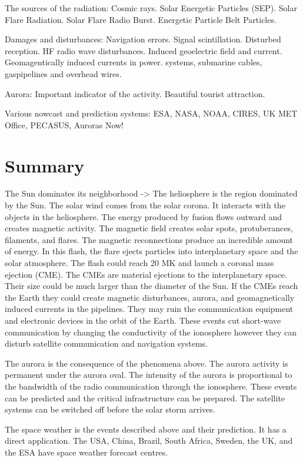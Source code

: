 \documentclass[sn-aps]{sn-jnl}%
\begin{document}
The sources of the radiation: Cosmic rays. Solar Energetic Particles (SEP). Solar Flare Radiation. Solar Flare Radio Burst. Energetic Particle Belt Particles.

Damages and disturbances: Navigation errors. Signal scintillation. Disturbed reception. HF radio wave disturbances. Induced geoelectric field and current. Geomagentically induced currents in power. systems, submarine cables, gaspipelines and overhead wires.

Aurora: Important indicator of the activity. Beautiful tourist attraction.

Various nowcast and prediction systems: ESA, NASA, NOAA, CIRES, UK MET Office, PECASUS, Auroras Now!

\section{Summary}
\label{sec:sum}

The Sun dominates its neighborhood -> The heliosphere is the region dominated by the Sun. The solar wind comes from the solar corona. It interacts with the objects in the heliosphere. The energy produced by fusion flows outward and creates magnetic activity. The magnetic field creates solar spots, protuberances, filaments, and flares. The magnetic reconnections produce an incredible amount of energy. In this flash, the flare ejects particles into interplanetary space and the solar atmosphere. The flash could reach 20 MK and launch a coronal mass ejection (CME). The CMEs are material ejections to the interplanetary space. Their size could be much larger than the diameter of the Sun. If the CMEs reach the Earth they could create magnetic disturbances, aurora, and geomagnetically induced currents in the pipelines. They may ruin the communication equipment and electronic devices in the orbit of the Earth. These events cut short-wave communication by changing the conductivity of the ionosphere however they can disturb satellite communication and navigation systems.

The aurora is the consequence of the phenomena above. The aurora activity is permanent under the aurora oval. The intensity of the aurora is proportional to the bandwidth of the radio communication through the ionosphere. These events can be predicted and the critical infrastructure can be prepared. The satellite systems can be switched off
before the solar storm arrives.

The space weather is the events described above and their prediction. It has a direct application. The USA, China, Brazil, South Africa, Sweden, the UK, and the ESA have space weather forecast centres.
\end{document}
